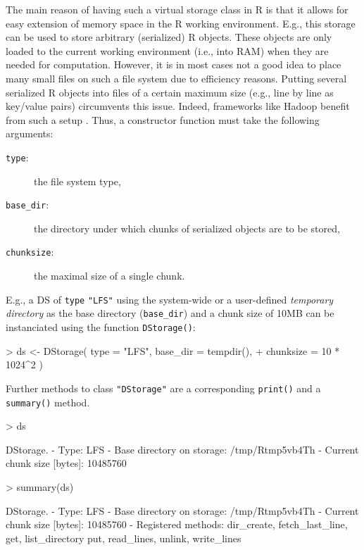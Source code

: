 \documentclass[fleqn]{article}
\let\code=\texttt
\let\proglang=\textsf
\newcommand{\class}[1]{\code{"#1"}}
\begin{document}
The main reason of having such a virtual storage class in \proglang{R}
is that it allows for easy extension of memory space in the
\proglang{R} working environment. E.g., this storage can be used to
store arbitrary (serialized) \proglang{R} objects. These objects are
only loaded to the current working environment (i.e., into RAM) when
they are needed for computation. However, it is in most cases not a
good idea to place many small files on such a file system due to
efficiency reasons. Putting several serialized \proglang{R} objects
into files of a certain maximum size (e.g., line by line as key/value
pairs) circumvents this issue. Indeed, frameworks like Hadoop benefit
from such a setup \citep[see Section \emph{Data Organization}
in][]{Borthakur:2010}. Thus, a constructor function must take the
following arguments:
\begin{description}
\item[\code{type}:] the file system type,
\item[\code{base\_dir}:] the directory under which chunks of
  serialized objects are to be stored,
\item[\code{chunksize}:] the maximal size of a single chunk.
\end{description}

E.g., a DS of \code{type} \code{"LFS"} using the system-wide or a
user-defined \emph{temporary directory} as the base directory
(\code{base\_dir}) and a chunk size of 10MB can be instanciated using
the function \code{DStorage()}:
\begin{Schunk}
\begin{Sinput}
> ds <- DStorage( type = "LFS", base_dir = tempdir(),
+                 chunksize = 10 * 1024^2 )
\end{Sinput}
\end{Schunk}

Further methods to class \class{DStorage} are a corresponding
\code{print()} and a \code{summary()} method.
\begin{Schunk}
\begin{Sinput}
> ds
\end{Sinput}
\begin{Soutput}
DStorage.
- Type: LFS
- Base directory on storage: /tmp/Rtmp5vb4Th
- Current chunk size [bytes]: 10485760
\end{Soutput}
\begin{Sinput}
> summary(ds)
\end{Sinput}
\begin{Soutput}
DStorage.
- Type: LFS
- Base directory on storage: /tmp/Rtmp5vb4Th
- Current chunk size [bytes]: 10485760
- Registered methods:
  dir_create, fetch_last_line, get, list_directory
  put, read_lines, unlink, write_lines
\end{Soutput}
\end{Schunk}
\end{document}
